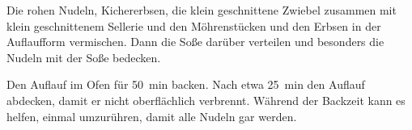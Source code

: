 \begin{recipe}
{        \step Die rohen Nudeln, Kichererbsen, die klein geschnittene Zwiebel zusammen mit klein geschnittenem Sellerie und den Möhrenstücken und den Erbsen in der Auflaufform vermischen. Dann die Soße darüber verteilen und besonders die Nudeln mit der Soße bedecken.

        \step Den Auflauf im Ofen für \SI{50}{\minute} backen. Nach etwa \SI{25}{\minute} den Auflauf abdecken, damit er nicht oberflächlich verbrennt. Während der Backzeit kann es helfen, einmal umzurühren, damit alle Nudeln gar werden.
    }



\end{recipe}

